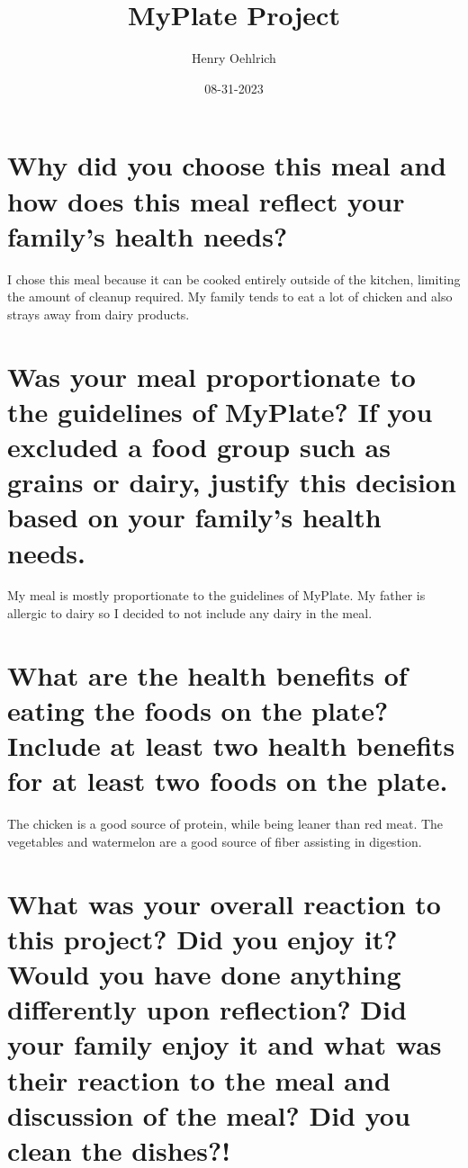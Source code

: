 \documentclass{article}
\title{MyPlate Project}
\author{Henry Oehlrich}
\date{08-31-2023}
\begin{document}
\maketitle{}
\section{Why did you choose this meal and how does this meal reflect your
family’s health needs?}

I chose this meal because it can be cooked entirely outside of the kitchen,
limiting the amount of cleanup required. My family tends to eat a lot of
chicken and also strays away from dairy products.

\section{Was your meal proportionate to the guidelines of MyPlate? If you
excluded a food group such as grains or dairy, justify this decision based on
your family’s health needs.}

My meal is mostly proportionate to the guidelines of MyPlate. My father is
allergic to dairy so I decided to not include any dairy in the meal.

\section{What are the health benefits of eating the foods on the plate? Include
at least two health benefits for at least two foods on the plate.}

The chicken is a good source of protein, while being leaner than red meat. The
vegetables and watermelon are a good source of fiber assisting in digestion.

\section{What was your overall reaction to this project? Did you enjoy it?
Would you have done anything differently upon reflection? Did your family enjoy
it and what was their reaction to the meal and discussion of the meal? Did you
clean the dishes?!}
\end{document}
